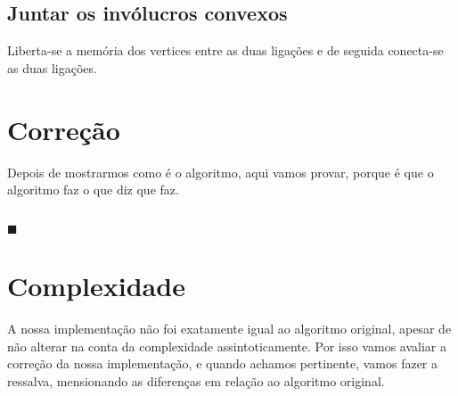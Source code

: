 \documentclass[11pt]{article}
\begin{document}
\subsection{ Juntar os invólucros convexos } 
Liberta-se a memória dos vertices entre as duas ligações e de seguida 
conecta-se as duas ligações.


\section{Correção}
Depois de mostrarmos como é o algoritmo,
aqui vamos provar, porque é que o algoritmo faz o que diz que faz.


\subsection{}

\hfill $\blacksquare$


\section{Complexidade}
A nossa implementação não foi exatamente igual ao algoritmo original,
apesar de não alterar na conta da complexidade assintoticamente.
Por isso vamos avaliar a correção da nossa implementação, e quando 
achamos pertinente, vamos fazer a ressalva, mensionando as diferenças 
em relação ao algoritmo original.
\end{document}
